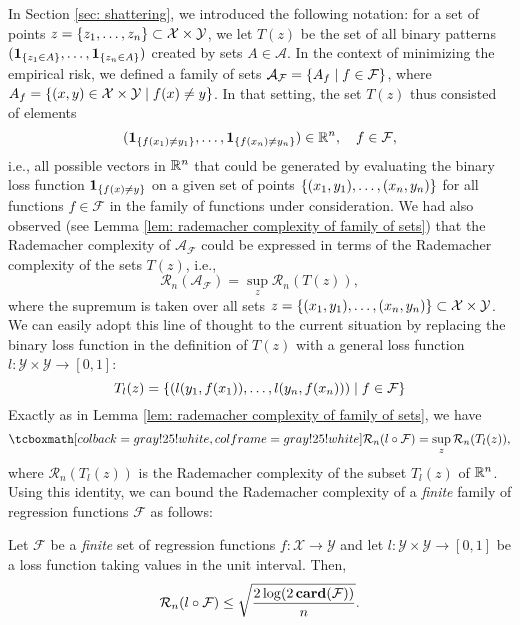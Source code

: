 In Section \ref{sec: shattering}, we introduced the following notation: for a set of points $z = \left\{z_1, \dots, z_n\right\} \subset \mathcal{X} \times \mathcal{Y}$, we let $T(z)$ be the set of all binary patterns $(\mathbf{1}_{\left\{z_1 \in A\right\}}, \dots, \mathbf{1}_{\left\{z_n \in A\right\}})$ created by sets $A \in \mathcal{A}$. In the context of minimizing the empirical risk, we defined a family of sets $\mathcal{A}_{\mathcal{F}} = \left\{A_f \mathrel{|} f \in \mathcal{F}\right\}$, where $A_f = \left\{(x, y) \in \mathcal{X} \times \mathcal{Y} \mathrel{|} f(x) \neq y\right\}$. In that setting, the set $T(z)$ thus consisted of elements
\[
    (\mathbf{1}_{\left\{f(x_1) \neq y_1\right\}}, \dots, \mathbf{1}_{\left\{f(x_n) \neq y_n\right\}}) \in \mathbb{R}^n, \quad f \in \mathcal{F},
\]
i.e., all possible vectors in $\mathbb{R}^n$ that could be generated by evaluating the binary loss function $\mathbf{1}_{\left\{f(x) \neq y\right\}}$ on a given set of points $\left\{(x_1, y_1), \dots, (x_n, y_n)\right\}$ for all functions $f \in \mathcal{F}$ in the family of functions under consideration. We had also observed (see Lemma \ref{lem: rademacher complexity of family of sets}) that the Rademacher complexity of $\mathcal{A}_{\mathcal{F}}$ could be expressed in terms of the Rademacher complexity of the sets $T(z)$, i.e.,
\[
    \mathcal{R}_n(\mathcal{A}_{\mathcal{F}}) = \sup_{z} \mathcal{R}_n(T(z)),
\]
where the supremum is taken over all sets $z = \left\{(x_1, y_1), \dots, (x_n, y_n)\right\} \subset \mathcal{X} \times \mathcal{Y}$. We can easily adopt this line of thought to the current situation by replacing the binary loss function in the definition of $T(z)$ with a general loss function $l \colon \mathcal{Y} \times \mathcal{Y} \to [0, 1]$:
\begin{equation}
    T_l(z) = \left\{( l(y_1, f(x_1)), \dots, l(y_n, f(x_n)) ) \mathrel{|} f \in \mathcal{F}\right\}
\end{equation}
Exactly as in Lemma \ref{lem: rademacher complexity of family of sets}, we have
\begin{equation}
\label{eq: rademacher complexity for general loss}
    \highlightMath{
        \mathcal{R}_n(l \circ \mathcal{F}) = \sup_z \mathcal{R}_n(T_l(z)),
    }
\end{equation}
where $\mathcal{R}_n(T_l(z))$ is the Rademacher complexity of the subset $T_l(z)$ of $\mathbb{R}^n$. Using this identity, we can bound the Rademacher complexity of a \emph{finite} family of regression functions $\mathcal{F}$ as follows:

\begin{proposition}
\label{prop: bound on rademacher complexity for general loss}
Let $\mathcal{F}$ be a \emph{finite} set of regression functions $f \colon \mathcal{X} \to \mathcal{Y}$ and let $l \colon \mathcal{Y} \times \mathcal{Y} \to [0, 1]$ be a loss function taking values in the unit interval. Then,
\[
    \mathcal{R}_n(l \circ \mathcal{F}) \leq \sqrt{\frac{2 \log(2 \, \mathrm{\mathbf{card}}(\mathcal{F}))}{n}}.
\]
\end{proposition}

